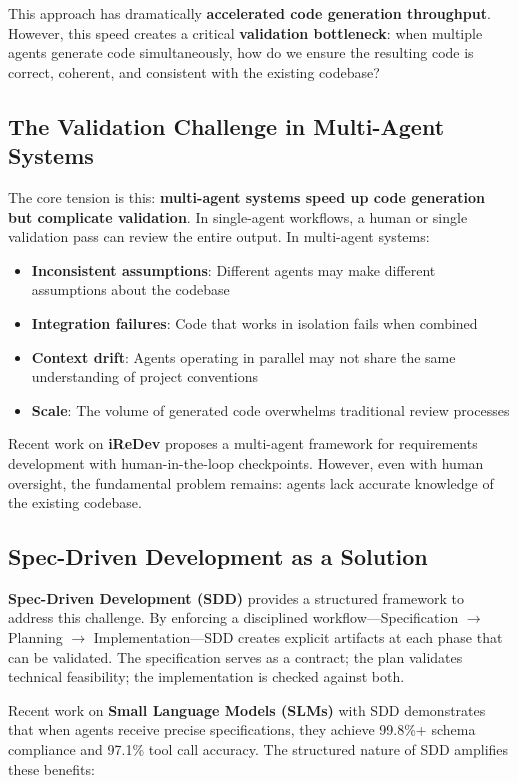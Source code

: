 \documentclass[sigconf,anonymous,review]{acmart}
\begin{document}
This approach has dramatically \textbf{accelerated code generation throughput}. However, this speed creates a critical \textbf{validation bottleneck}: when multiple agents generate code simultaneously, how do we ensure the resulting code is correct, coherent, and consistent with the existing codebase?

\subsection{The Validation Challenge in Multi-Agent Systems}

The core tension is this: \textbf{multi-agent systems speed up code generation but complicate validation}. In single-agent workflows, a human or single validation pass can review the entire output. In multi-agent systems:

\begin{itemize}
  \item \textbf{Inconsistent assumptions}: Different agents may make different assumptions about the codebase
  \item \textbf{Integration failures}: Code that works in isolation fails when combined
  \item \textbf{Context drift}: Agents operating in parallel may not share the same understanding of project conventions
  \item \textbf{Scale}: The volume of generated code overwhelms traditional review processes
\end{itemize}

Recent work on \textbf{iReDev} proposes a multi-agent framework for requirements development with human-in-the-loop checkpoints. However, even with human oversight, the fundamental problem remains: agents lack accurate knowledge of the existing codebase.

\subsection{Spec-Driven Development as a Solution}

\textbf{Spec-Driven Development (SDD)} provides a structured framework to address this challenge. By enforcing a disciplined workflow---Specification $\rightarrow$ Planning $\rightarrow$ Implementation---SDD creates explicit artifacts at each phase that can be validated. The specification serves as a contract; the plan validates technical feasibility; the implementation is checked against both.

Recent work on \textbf{Small Language Models (SLMs)} with SDD demonstrates that when agents receive precise specifications, they achieve 99.8\%+ schema compliance and 97.1\% tool call accuracy. The structured nature of SDD amplifies these benefits:
\end{document}
